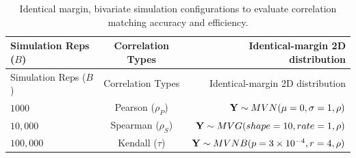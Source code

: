 \documentclass[]{article}
\begin{document}
\begin{longtable}[]{@{}lcr@{}}
\caption{\label{tab:sims} Identical margin, bivariate simulation configurations to evaluate correlation matching accuracy and efficiency.}\tabularnewline
\toprule
\begin{minipage}[b]{0.23\columnwidth}\raggedright
Simulation Reps (\(B\))\strut
\end{minipage} & \begin{minipage}[b]{0.28\columnwidth}\centering
Correlation Types\strut
\end{minipage} & \begin{minipage}[b]{0.40\columnwidth}\raggedleft
Identical-margin 2D distribution\strut
\end{minipage}\tabularnewline
\midrule
\endfirsthead
\toprule
\begin{minipage}[b]{0.23\columnwidth}\raggedright
Simulation Reps (\(B\))\strut
\end{minipage} & \begin{minipage}[b]{0.28\columnwidth}\centering
Correlation Types\strut
\end{minipage} & \begin{minipage}[b]{0.40\columnwidth}\raggedleft
Identical-margin 2D distribution\strut
\end{minipage}\tabularnewline
\midrule
\endhead
\begin{minipage}[t]{0.23\columnwidth}\raggedright
\(1000\)\strut
\end{minipage} & \begin{minipage}[t]{0.28\columnwidth}\centering
Pearson (\(\rho_P\))\strut
\end{minipage} & \begin{minipage}[t]{0.40\columnwidth}\raggedleft
\({ \bf Y} \sim MVN( \mu= 0 , \sigma = 1, \rho )\)\strut
\end{minipage}\tabularnewline
\begin{minipage}[t]{0.23\columnwidth}\raggedright
\(10,000\)\strut
\end{minipage} & \begin{minipage}[t]{0.28\columnwidth}\centering
Spearman (\(\rho_S\))\strut
\end{minipage} & \begin{minipage}[t]{0.40\columnwidth}\raggedleft
\({ \bf Y} \sim MVG( shape = 10, rate = 1, \rho )\)\strut
\end{minipage}\tabularnewline
\begin{minipage}[t]{0.23\columnwidth}\raggedright
\(100,000\)\strut
\end{minipage} & \begin{minipage}[t]{0.28\columnwidth}\centering
Kendall (\(\tau\))\strut
\end{minipage} & \begin{minipage}[t]{0.40\columnwidth}\raggedleft
\({ \bf Y} \sim MVNB(p = \ensuremath{3\times 10^{-4}}, r = 4,\rho)\)\strut
\end{minipage}\tabularnewline
\bottomrule
\end{longtable}
\end{document}
